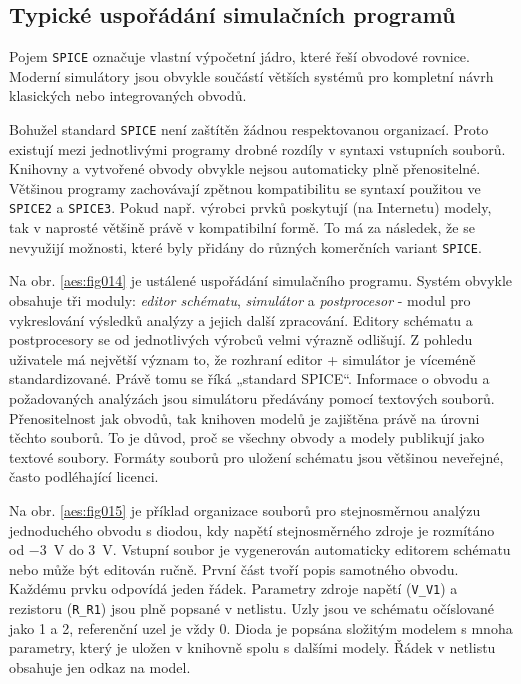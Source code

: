     \subsection{Typické uspořádání simulačních programů}
      Pojem \texttt{SPICE} označuje vlastní výpočetní jádro, které řeší obvodové rovnice. Moderní
      simulátory jsou obvykle součástí větších systémů pro kompletní návrh klasických nebo
      integrovaných obvodů.

      Bohužel standard \texttt{SPICE} není zaštítěn žádnou respektovanou organizací. Proto existují
      mezi jednotlivými programy drobné rozdíly v syntaxi vstupních souborů. Knihovny a vytvořené
      obvody obvykle nejsou automaticky plně přenositelné. Většinou programy zachovávají zpětnou
      kompatibilitu se syntaxí použitou ve \texttt{SPICE2} a \texttt{SPICE3}. Pokud např. výrobci
      prvků poskytují (na Internetu) modely, tak v naprosté většině právě v kompatibilní formě. To
      má za následek, že se nevyužijí možnosti, které byly přidány do různých komerčních variant
      \texttt{SPICE}.

      Na obr. \ref{aes:fig014} je ustálené uspořádání simulačního programu. Systém obvykle obsahuje
      tři moduly: \emph{editor schématu}, \emph{simulátor} a \emph{postprocesor} - modul pro
      vykreslování výsledků analýzy a jejich další zpracování. Editory schématu a postprocesory se
      od jednotlivých výrobců velmi výrazně odlišují. Z pohledu uživatele má největší význam to, že
      rozhraní editor + simulátor je víceméně standardizované. Právě tomu se říká „standard SPICE“.
      Informace o obvodu a požadovaných analýzách jsou simulátoru předávány pomocí textových
      souborů. Přenositelnost jak obvodů, tak knihoven modelů je zajištěna právě na úrovni těchto
      souborů. To je důvod, proč se všechny obvody a modely publikují jako textové soubory. Formáty
      souborů pro uložení schématu jsou většinou neveřejné, často podléhající licenci.


      Na obr. \ref{aes:fig015} je příklad organizace souborů pro stejnosměrnou analýzu jednoduchého
      obvodu s diodou, kdy napětí stejnosměrného zdroje je rozmítáno od \qty{-3}{\V} do \qty{+3}{\V}.
      Vstupní soubor je vygenerován automaticky editorem schématu nebo může být editován ručně.
      První část tvoří popis samotného obvodu. Každému prvku odpovídá jeden řádek. Parametry zdroje
      napětí (\texttt{V\_V1}) a rezistoru (\texttt{R\_R1}) jsou plně popsané v netlistu. Uzly jsou
      ve schématu očíslované jako \num{1} a \num{2}, referenční uzel je vždy \num{0}. Dioda je
      popsána složitým modelem s mnoha parametry, který je uložen v knihovně spolu s dalšími modely.
      Řádek v netlistu obsahuje jen odkaz na model.

